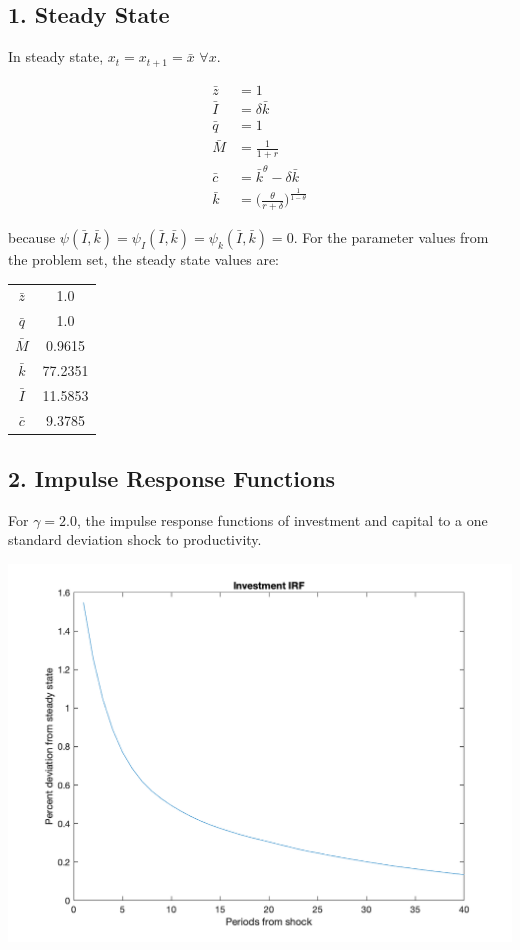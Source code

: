 \documentclass{article}
\begin{document}
\pagebreak

\subsection*{1. Steady State}

In steady state, $x_t = x_{t+1} = \bar{x}$ $\forall x$.

\begin{align*}
\bar{z} &= 1\\
\bar{I} &= \delta \bar{k} \\
\bar{q} &= 1\\
\bar{M} &= \frac{1}{1 +r}  \\
\bar{c} &= \bar{k}^\theta - \delta \bar{k}\\
\bar{k} &= \Bigg(\frac{\theta}{r+\delta}\Bigg)^{\frac{1}{1 - \theta}}
\end{align*}

because $\psi(\bar{I}, \bar{k}) = \psi_I(\bar{I}, \bar{k}) = \psi_k(\bar{I}, \bar{k}) = 0$. For the parameter values from the problem set, the steady state values are:

\begin{table}[h!]
  \begin{center}
    \label{tab:table1}
    \begin{tabular}{c|c}
      \hline
      $\bar{z}$ & 1.0 \\
      $\bar{q}$ & 1.0 \\
      $\bar{M}$ & 0.9615\\
      $\bar{k}$ & 77.2351\\
      $\bar{I}$ & 11.5853\\
      $\bar{c}$ & 9.3785\\
    \end{tabular}
  \end{center}
\end{table}

\subsection*{2. Impulse Response Functions}

For $\gamma = 2.0$, the impulse response functions of investment and capital to a one standard deviation shock to productivity.

\includegraphics[scale=.6]{p2_i}
\end{document}
